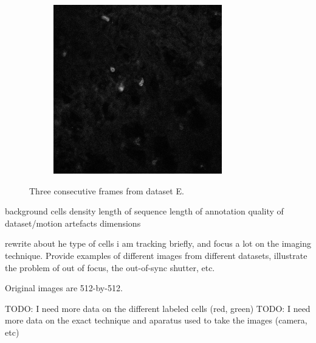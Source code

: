 \begin{figure}[h]
\begin{subfigure}{.32\textwidth}
		\end{subfigure}
		\hfill
		\begin{subfigure}{.32\textwidth}
		\includegraphics[width=\textwidth]{images/seriesm170_13cropped018}
		\end{subfigure}
		\caption{Three consecutive frames from dataset E.}
		\label{fig:data_datasetE}
	\end{figure}
    	
    	
    background
    	cells
    	density
    	length of sequence
    	length of annotation
    	quality of dataset/motion artefacts
    	dimensions

 
    rewrite about he type of cells i am tracking briefly, and focus a lot on the imaging technique. Provide examples of different images from different datasets,
    illustrate the problem of out of focus, the out-of-sync shutter, etc.
    

    
    Original images are 512-by-512.
    
    
    TODO: I need more data on the different labeled cells (red, green)
    TODO: I need more data on the exact technique and aparatus used to take the images (camera, etc)
    
    
